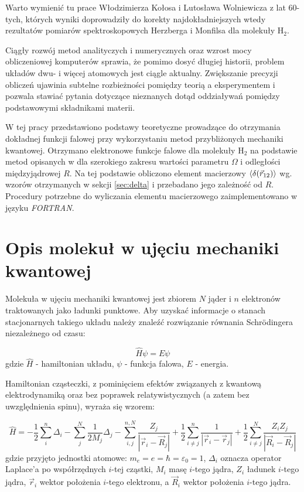 \documentclass[a4paper,12pt]{article}
\numberwithin{equation}{section}
\numberwithin{table}{section}
\numberwithin{figure}{section}
\begin{document}
Warto wymienić tu prace Włodzimierza Kołosa i Lutosława Wolniewicza z lat 60-tych, których wyniki doprowadziły do korekty najdokładniejszych wtedy rezultatów pomiarów spektroskopowych Herzberga i Monfilsa dla molekuły H$_2$. \cite{kolos60,kolos64,kolos68_improv, kolos68_disc}

Ciągły rozwój metod analityczych i numerycznych oraz wzrost mocy obliczeniowej komputerów sprawia, że pomimo dosyć długiej historii, problem układów dwu- i więcej atomowych jest ciągle aktualny. Zwiększanie precyzji obliczeń ujawinia subtelne rozbieżności pomiędzy teorią a eksperymentem i pozwala stawiać pytania dotyczące nieznanych dotąd oddziaływań pomiędzy podstawowymi składnikami materii.

W tej pracy przedstawiono podstawy teoretyczne prowadzące do otrzymania dokładnej funkcji falowej przy wykorzystaniu metod przybliżonych mechaniki kwantowej. Otrzymano elektronowe funkcje falowe dla molekuły H$_2$ na podstawie metod opisanych w \cite{pachucki2010,pachucki2012,pachucki2013,pachucki2013a} dla szerokiego zakresu wartości parametru $\Omega$ i odległości międzyjądrowej $R$. Na tej podstawie obliczono element macierzowy $\braket{\delta({\vec{r}_{12}})}$ wg. wzorów otrzymanych w sekcji \ref{sec:delta} i przebadano jego zależność od $R$. Procedury potrzebne do wyliczania elementu macierzowego zaimplementowano w języku \emph{FORTRAN}.
\newpage

%
%
\section{Opis molekuł w ujęciu mechaniki kwantowej}

Molekuła w ujęciu mechaniki kwantowej jest zbiorem $N$ jąder i $n$ elektronów traktowanych jako ładunki punktowe. Aby uzyskać informacje o stanach stacjonarnych takiego układu należy znaleźć rozwiązanie równania Schr\"{o}dingera niezależnego od czasu:

\begin{equation} \label{eq:schrodinger}
\hat{H}\psi = E \psi
\end{equation}
gdzie $\hat{H}$ - hamiltonian układu, $\psi$ - funkcja falowa, $E$ - energia.

Hamiltonian cząsteczki, z pominięciem efektów związanych z kwantową elektrodynamiką oraz bez poprawek relatywistycznych (a zatem bez uwzględnienia spinu), wyraża się wzorem:

\begin{equation} \label{eq:hamiltonian}
\hat{H} = - \frac{1}{2} \sum\limits_{i}^n \Delta_i  - \sum\limits_{j}^{N} \frac{1}{2M_j}\Delta_j -  \sum\limits_{i, j}^{n, N} \frac{Z_j}{|\vec{r}_i - \vec{R}_j|} + \frac{1}{2} \sum\limits_{i \neq j}^{n} \frac{1}{|\vec{r}_i - \vec{r}_j|} + \frac{1}{2} \sum\limits_{i \neq j}^{N} \frac{Z_i Z_j}{|\vec{R}_i - \vec{R}_j|}
\end{equation}
gdzie przyjęto jednostki atomowe: $m_e = e = \hbar = \varepsilon_0 = 1$, $\Delta_i$ oznacza operator Laplace'a po współrzędnych $i$-tej cząstki, $M_i$ masę $i$-tego jądra, $Z_i$ ładunek $i$-tego jądra, $\vec{r}_i$ wektor położenia $i$-tego elektronu, a $\vec{R}_i$ wektor położenia $i$-tego jądra. 
\end{document}
